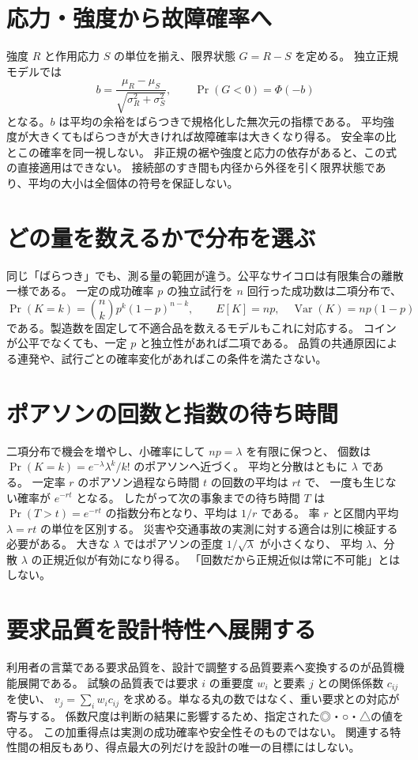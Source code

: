 \section{応力・強度から故障確率へ}
\label{theory:quality:stress_strength}
強度 \(R\) と作用応力 \(S\) の単位を揃え、限界状態 \(G=R-S\) を定める。
独立正規モデルでは
\[
 b=\frac{\mu_R-\mu_S}{\sqrt{\sigma_R^2+\sigma_S^2}},\qquad
 \Pr(G<0)=\Phi(-b)
\]
となる。\(b\) は平均の余裕をばらつきで規格化した無次元の指標である。
平均強度が大きくてもばらつきが大きければ故障確率は大きくなり得る。
安全率の比とこの確率を同一視しない。
非正規の裾や強度と応力の依存があると、この式の直接適用はできない。
接続部のすき間も内径から外径を引く限界状態であり、平均の大小は全個体の符号を保証しない。

\section{どの量を数えるかで分布を選ぶ}
\label{theory:quality:models}
同じ「ばらつき」でも、測る量の範囲が違う。公平なサイコロは有限集合の離散一様である。
一定の成功確率 \(p\) の独立試行を \(n\) 回行った成功数は二項分布で、
\[
 \Pr(K=k)={n\choose k}p^k(1-p)^{n-k},\qquad
 E[K]=np,\quad \operatorname{Var}(K)=np(1-p)
\]
である。製造数を固定して不適合品を数えるモデルもこれに対応する。
コインが公平でなくても、一定 \(p\) と独立性があれば二項である。
品質の共通原因による連発や、試行ごとの確率変化があればこの条件を満たさない。
\cite{stat_nist_binomial}

\section{ポアソンの回数と指数の待ち時間}
\label{theory:quality:poisson}
二項分布で機会を増やし、小確率にして \(np=\lambda\) を有限に保つと、
個数は \(\Pr(K=k)=e^{-\lambda}\lambda^k/k!\) のポアソンへ近づく。
平均と分散はともに \(\lambda\) である。
一定率 \(r\) のポアソン過程なら時間 \(t\) の回数の平均は \(rt\) で、
一度も生じない確率が \(e^{-rt}\) となる。
したがって次の事象までの待ち時間 \(T\) は
\(\Pr(T>t)=e^{-rt}\) の指数分布となり、平均は \(1/r\) である。
率 \(r\) と区間内平均 \(\lambda=rt\) の単位を区別する。
災害や交通事故の実測に対する適合は別に検証する必要がある。
大きな \(\lambda\) ではポアソンの歪度 \(1/\sqrt{\lambda}\) が小さくなり、
平均 \(\lambda\)、分散 \(\lambda\) の正規近似が有効になり得る。
「回数だから正規近似は常に不可能」とはしない。\cite{stat_nist_poisson,stat_nist_exponential}

\section{要求品質を設計特性へ展開する}
\label{theory:quality:qfd}
利用者の言葉である要求品質を、設計で調整する品質要素へ変換するのが品質機能展開である。
試験の品質表では要求 \(i\) の重要度 \(w_i\) と要素 \(j\) との関係係数 \(c_{ij}\) を使い、
\(v_j=\sum_i w_i c_{ij}\) を求める。単なる丸の数ではなく、重い要求との対応が寄与する。
係数尺度は判断の結果に影響するため、指定された◎・○・△の値を守る。
この加重得点は実測の成功確率や安全性そのものではない。
関連する特性間の相反もあり、得点最大の列だけを設計の唯一の目標にはしない。
\cite{quality_qfd_scale}

